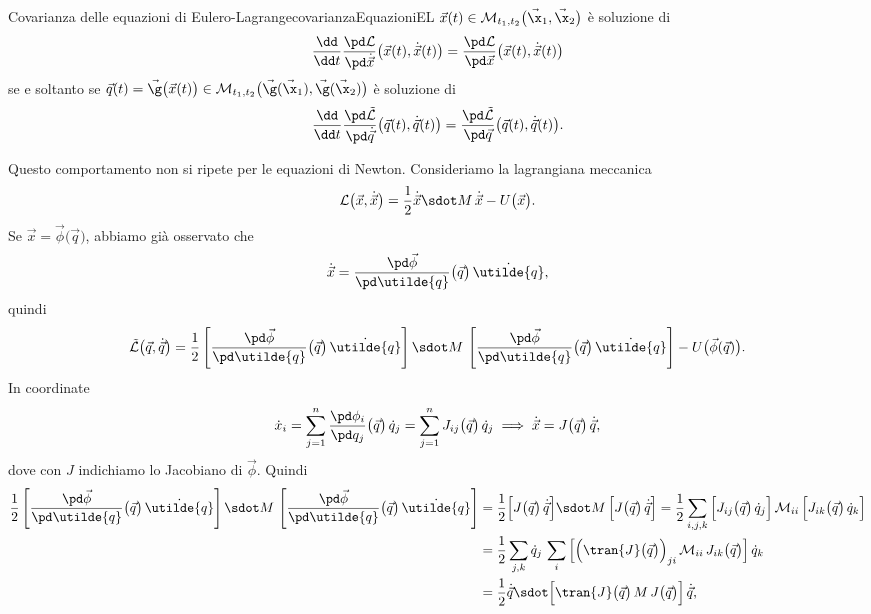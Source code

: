 \begin{remark}{Covarianza delle equazioni di Eulero-Lagrange}{covarianzaEquazioniEL}
	\(\vec{x}(t)\in \mathcal{M}_{t_1,t_2}\big(\vec{\x}_1,\vec{\x}_2\big)\) è soluzione di
	\[
		\frac{\dd}{\dd t}\frac{\pd\mathcal{L}}{\pd\dot{\vec{x}}}\big(\vec{x}(t),\dot{\vec{x}}(t)\big) = \frac{\pd\mathcal{L}}{\pd\vec{x}}\big(\vec{x}(t),\dot{\vec{x}}(t)\big)
	\]
	se e soltanto se \(\vec{q}(t)=\vec{\g}\big(\vec{x}(t)\big)\in \mathcal{M}_{t_1,t_2}\big(\vec{\g}(\vec{\x}_1),\vec{\g}(\vec{\x}_2)\big)\) è soluzione di
	\[
		\frac{\dd}{\dd t}\frac{\pd\tilde{\mathcal{L}}}{\pd\dot{\vec{q}}}\big(\vec{q}(t),\dot{\vec{q}}(t)\big) = \frac{\pd\tilde{\mathcal{L}}}{\pd\vec{q}}\big(\vec{q}(t),\dot{\vec{q}}(t)\big).
	\]
\end{remark}
\noindent
Questo comportamento non si ripete per le equazioni di Newton. Consideriamo la lagrangiana meccanica
\[
	\mathcal{L}\big(\vec{x},\dot{\vec{x}}\big) = \frac{1}{2}\dot{\vec{x}} \sdot M\,\dot{\vec{x}} - U\big(\vec{x}\big).
\]
Se \(\vec{x}=\vec{\phi}\big(\vec{q}\big)\), abbiamo già osservato che
\[
	\dot{\vec{x}} = \frac{\pd\vec{\phi}}{\pd\utilde{q}}\big(\vec{q}\big)\,\dot{\utilde{q}},
\]
quindi
\[
	\tilde{\mathcal{L}}\big(\vec{q},\dot{\vec{q}}\big) = \frac{1}{2}\left[\frac{\pd\vec{\phi}}{\pd\utilde{q}}\big(\vec{q}\big)\,\dot{\utilde{q}}\right] \sdot M\,\left[\frac{\pd\vec{\phi}}{\pd\utilde{q}}\big(\vec{q}\big)\,\dot{\utilde{q}}\right] - U\big(\vec{\phi}(\vec{q})\big).
\]
In coordinate
\[
	\dot{x}_i = \sum_{j=1}^n \frac{\pd\phi_i}{\pd q_j}\big(\vec{q}\big)\,\dot{q}_j = \sum_{j=1}^n J_{i j}\big(\vec{q}\big)\,\dot{q}_j \implies \dot{\vec{x}} = J\big(\vec{q}\big)\,\dot{\vec{q}},
\]
dove con \(J\) indichiamo lo Jacobiano di \(\vec{\phi}\). Quindi
\[
	\begin{split}
		\frac{1}{2}\left[\frac{\pd\vec{\phi}}{\pd\utilde{q}}\big(\vec{q}\big)\,\dot{\utilde{q}}\right] \sdot M\,\left[\frac{\pd\vec{\phi}}{\pd\utilde{q}}\big(\vec{q}\big)\,\dot{\utilde{q}}\right] & = \frac{1}{2}\Big[ J\big(\vec{q}\big)\,\dot{\vec{q}} \Big] \sdot M\,\Big[ J\big(\vec{q}\big)\,\dot{\vec{q}} \Big]  = \frac{1}{2}\sum_{i,j,k} \Big[J_{i j}\big(\vec{q}\big)\,\dot{q}_j\Big]\,\mathcal{M}_{ii}\,\Big[J_{i k}\big(\vec{q}\big)\,\dot{q}_k\Big]\\
		& = \frac{1}{2}\sum_{j,k}\dot{q}_j\,\sum_{i}\Big[\Big(\tran{J}\big(\vec{q}\big)\Big)_{j i}\,\mathcal{M}_{i i}\,J_{i k}\big(\vec{q}\big)\Big]\,\dot{q}_k\\
		& = \frac{1}{2}\dot{\vec{q}} \sdot\Big[\tran{J}\big(\vec{q}\big)\,M\,J\big(\vec{q}\big)\Big]\,\dot{\vec{q}},
	\end{split}
\]
